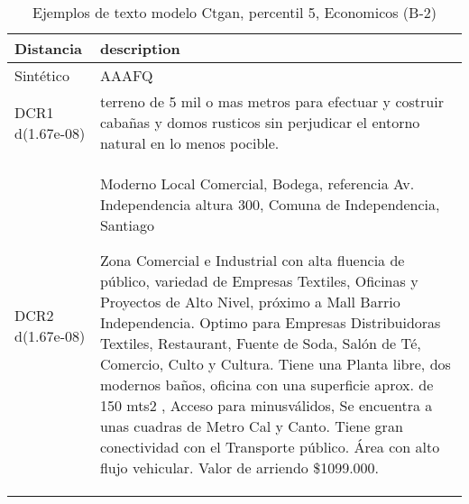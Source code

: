 \begin{table}[H]
\centering
\fontsize{10}{14}\selectfont
\caption{Ejemplos de texto modelo Ctgan, percentil 5, Economicos (B-2)}
\label{table-example-economicos-b-2-ctgan-5p-text}
\begin{tabular}{|l|m{35em}|}
\hline
\rowcolor[gray]{0.8}
Distancia & description \\
\hline Sintético & AAAFQ \\
\hline DCR1 d(1.67e-08) & terreno de 5 mil o mas metros para efectuar y costruir caba\~nas y domos rusticos sin perjudicar el entorno natural en lo menos pocible. \\
\hline DCR2 d(1.67e-08) & Moderno  Local Comercial, Bodega, referencia Av. Independencia altura 300, Comuna de Independencia, Santiago

Zona Comercial e Industrial con alta fluencia de p\'ublico, variedad de Empresas Textiles, Oficinas y Proyectos de Alto Nivel, pr\'oximo a Mall Barrio Independencia. Optimo para Empresas Distribuidoras Textiles, Restaurant, Fuente de Soda, Sal\'on de T\'e, Comercio, Culto y Cultura. Tiene una Planta libre, dos modernos ba\~nos, oficina con una superficie aprox. de 150 mts2 , Acceso para minusv\'alidos,  Se encuentra a unas cuadras de Metro Cal y Canto. Tiene gran conectividad con el Transporte p\'ublico. \'Area con alto flujo vehicular. Valor de arriendo \$1099.000. \\
\hline
\end{tabular}
\end{table}
